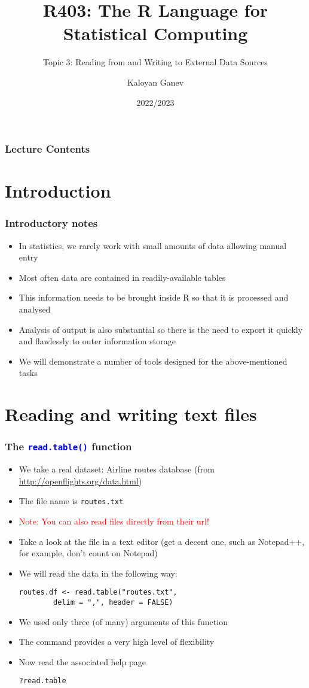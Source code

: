 \documentclass[10pt]{beamer}
\title{R403: The R Language for Statistical Computing}
\subtitle{Topic 3: \textcolor{myred}{Reading from and Writing to External Data Sources}}
\author{Kaloyan Ganev}
\date{2022/2023}
\newcommand{\cc}[1]{\texttt{\textcolor{blue}{#1}}}
\theoremstyle{definition}
\begin{document}
\maketitle

\begin{frame}[fragile]
\frametitle{Lecture Contents}
\tableofcontents
\end{frame}

\section{Introduction}
\begin{frame}[fragile]
\frametitle{Introductory notes}
\begin{itemize}
	\item In statistics, we rarely work with small amounts of data allowing manual entry
	\item Most often data are contained in readily-available tables
	\item This information needs to be brought inside R so that it is processed and analysed
	\item Analysis of output is also substantial so there is the need to export it quickly and flawlessly to outer information storage
	\item We will demonstrate a number of tools designed for the above-mentioned tasks
\end{itemize}
\end{frame}

\section{Reading and writing text files}
\begin{frame}[fragile]
\frametitle{The \cc{read.table()} function}
\begin{itemize}
	\item We take a real dataset: Airline routes database (from \url{http://openflights.org/data.html})
	\item The file name is \texttt{routes.txt}
	\item \textcolor{red}{Note: You can also read files directly from their url!}
	\item Take a look at the file in a text editor (get a decent one, such as Notepad++, for example, don't count on Notepad)
	\item We will read the data in the following way:
	\begin{lstlisting}[style = rstyle, breaklines]
	routes.df <- read.table("routes.txt", 
		delim = ",", header = FALSE)
	\end{lstlisting}
	\item We used only three (of many) arguments of this function
	\item The command provides a very high level of flexibility
	\item Now read the associated help page
	\begin{lstlisting}[style = rstyle, breaklines]
	?read.table
	\end{lstlisting}
\end{itemize}
\end{frame}
\end{document}
